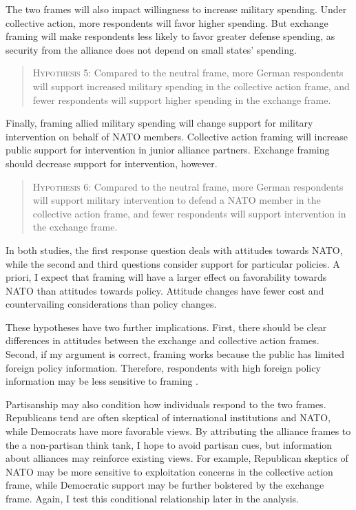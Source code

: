 \documentclass[12pt]{article}
\begin{document}
The two frames will also impact willingness to increase military spending. 
Under collective action, more respondents will favor higher spending. 
But exchange framing will make respondents less likely to favor greater defense spending, as security from the alliance does not depend on small states' spending. 


\begin{quote}
\textsc{Hypothesis 5}: Compared to the neutral frame, more German respondents will support increased military spending in the collective action frame, and fewer respondents will support higher spending in the exchange frame.
\end{quote}


Finally, framing allied military spending will change support for military intervention on behalf of NATO members. 
Collective action framing will increase public support for intervention in junior alliance partners. 
Exchange framing should decrease support for intervention, however. 


\begin{quote}
\textsc{Hypothesis 6}: Compared to the neutral frame, more German respondents will support military intervention to defend a NATO member in the collective action frame, and fewer respondents will support intervention in the exchange frame. 
\end{quote} 



In both studies, the first response question deals with attitudes towards NATO, while the second and third questions consider support for particular policies. 
A priori, I expect that framing will have a larger effect on favorability towards NATO than attitudes towards policy. 
Attitude changes have fewer cost and countervailing considerations than policy changes. 


These hypotheses have two further implications. 
First, there should be clear differences in attitudes between the exchange and collective action frames. 
Second, if my argument is correct, framing works because the public has limited foreign policy information. 
Therefore, respondents with high foreign policy information may be less sensitive to framing \citep{Druckman2001}. 


Partisanship may also condition how individuals respond to the two frames. 
Republicans tend are often skeptical of international institutions and NATO, while Democrats have more favorable views.
By attributing the alliance frames to the a non-partisan think tank, I hope to avoid partisan cues, but information about alliances may reinforce existing views. 
For example, Republican skeptics of NATO may be more sensitive to exploitation concerns in the collective action frame, while Democratic support may be further bolstered by the exchange frame. 
Again, I test this conditional relationship later in the analysis. 
\end{document}
